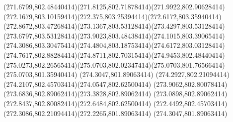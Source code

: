 {{	\curveto(271.6799,802.48440414)(271.8125,802.71878414)(271.9922,802.90628414)
	\curveto(272.1679,803.10159414)(272.375,803.25394414)(272.6172,803.35940414)
	\curveto(272.8672,803.47268414)(273.1367,803.53128414)(273.4297,803.53128414)
	\curveto(273.6797,803.53128414)(273.9023,803.48438414)(274.1015,803.39065414)
	\curveto(274.3086,803.30475414)(274.4804,803.18753414)(274.6172,803.03128414)
	\curveto(274.7617,802.88284414)(274.8711,802.70315414)(274.9453,802.48440414)
	\curveto(275.0273,802.26565414)(275.0703,802.02347414)(275.0703,801.76566414)
	\lineto(275.0703,801.35940414)
	\closepath
	\moveto(274.3047,801.89063414)
	\curveto(274.2927,802.21094414)(274.2107,802.45703414)(274.0547,802.62500414)
	\curveto(273.9062,802.80078414)(273.6836,802.89062414)(273.3828,802.89062414)
	\curveto(273.0898,802.89062414)(272.8437,802.80082414)(272.6484,802.62500414)
	\curveto(272.4492,802.45703414)(272.3086,802.21094414)(272.2265,801.89063414)
	\closepath
	\moveto(274.3047,801.89063414)
}
}
{
}
{
}
{
}
{
}
{
}
{
}
